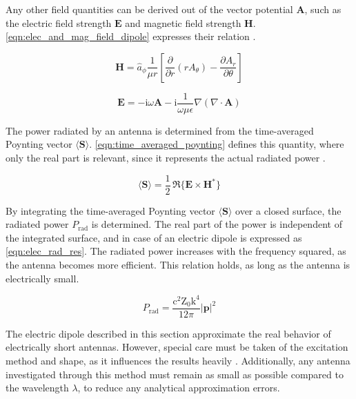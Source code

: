 Any other field quantities can be derived out of the vector potential $\mathbf{A}$, such as the electric field strength $\mathbf{E}$ and magnetic field strength $\mathbf{H}$. \autoref{eqn:elec_and_mag_field_dipole} expresses their relation \cite{Balanis_1997}. 

\begin{subequation}\label{eqn:elec_and_mag_field_dipole}
    \begin{equation}
    \mathbf{H} = \hat{a}_{\phi} \frac{1}{\mu r} \left[ \frac{\partial}{\partial r} (r A_{\theta}) - \frac{\partial A_{r}}{\partial \theta} \right]
    \end{equation}
    
    \begin{equation}
    \mathbf{E}=-\mathrm{i}\omega\mathbf{A}-\mathrm{i}\frac{1}{\omega\mu\epsilon}\nabla\left(\nabla\cdot\mathbf{A}\right)
    \end{equation}
    
\end{subequation}

The power radiated by an antenna is determined from the time-averaged Poynting vector $ \langle \mathbf{S} \rangle$. \autoref{eqn:time_averaged_poynting} defines this quantity, where only the real part is relevant, since it represents the actual radiated power \cite{Balanis_1997}.

\begin{equation}
    \langle \mathbf{S} \rangle = \frac{1}{2} \, \Re \{ \mathbf{E} \times \mathbf{H}^* \}
    \label{eqn:time_averaged_poynting}
\end{equation}

By integrating the time-averaged Poynting vector $ \langle \mathbf{S} \rangle$ over a closed surface, the radiated power $P_{\mathrm{rad}}$ is determined. The real part of the power is independent of the integrated surface, and in case of an electric dipole is expressed as \autoref{eqn:elec_rad_res}. The radiated power increases with the frequency squared, as the antenna becomes more efficient. This relation holds, as long as the antenna is electrically small.

\begin{equation}
    P_{\mathrm{rad}} = \frac{\mathrm{c}^2\mathrm{Z_0}\mathrm{k}^4}{12\pi}|\mathbf{p}|^2
    \label{eqn:elec_rad_res}
\end{equation}

The electric dipole described in this section approximate the real behavior of electrically short antennas. However, special care must be taken of the excitation method and shape, as it influences the results heavily \cite{Jackson}. Additionally, any antenna investigated through this method must remain as small as possible compared to the wavelength $\lambda$, to reduce any analytical approximation errors. 


